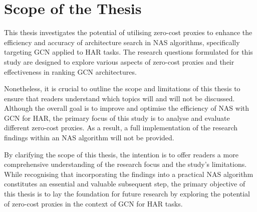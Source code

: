 \section{Scope of the Thesis}

This thesis investigates the potential of utilising zero-cost proxies to enhance the efficiency and accuracy of architecture search in \gls{NAS} algorithms, specifically targeting \gls{GCN} applied to \gls{HAR} tasks. The research questions formulated for this study are designed to explore various aspects of zero-cost proxies and their effectiveness in ranking \gls{GCN} architectures.

Nonetheless, it is crucial to outline the scope and limitations of this thesis to ensure that readers understand which topics will and will not be discussed. Although the overall goal is to improve and optimise the efficiency of \gls{NAS} with \gls{GCN} for \gls{HAR}, the primary focus of this study is to analyse and evaluate different zero-cost proxies. As a result, a full implementation of the research findings within an \gls{NAS} algorithm will not be provided.

By clarifying the scope of this thesis, the intention is to offer readers a more comprehensive understanding of the research focus and the study's limitations. While recognising that incorporating the findings into a practical \gls{NAS} algorithm constitutes an essential and valuable subsequent step, the primary objective of this thesis is to lay the foundation for future research by exploring the potential of zero-cost proxies in the context of \gls{GCN} for \gls{HAR} tasks.